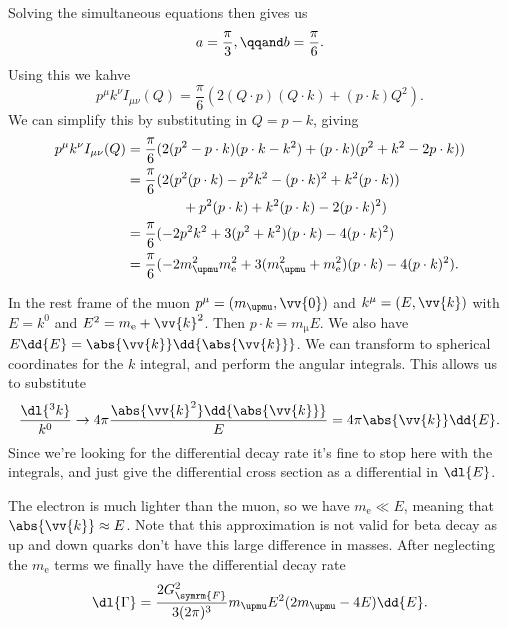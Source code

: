 \documentclass[fleqn]{NotesClass}
\newcommand{\Pparticle}[1]{\mathrm{#1}}
\newcommand{\Pex}{\ensuremath{\Pparticle{e}}}
\newcommand{\Pmux}{\ensuremath{\upmu}}
\newcommand{\fermiConst}{G_{\symrm{F}}}
\begin{document}
    Solving the simultaneous equations then gives us
    \begin{equation}
        a = \frac{\pi}{3}, \qqand b = \frac{\pi}{6}.
    \end{equation}
    Using this we kahve
    \begin{equation}
        p^\mu k^\nu I_{\mu\nu}(Q) = \frac{\pi}{6}(2(Q \cdot p)(Q \cdot k) + (p \cdot k)Q^2).
    \end{equation}
    We can simplify this by substituting in \(Q = p - k\), giving
    \begin{align}
        p^\mu k^\nu I_{\mu\nu}(Q) &= \frac{\pi}{6}(2(p^2 - p \cdot k)(p \cdot k - k^2) + (p \cdot k)(p^2 + k^2 - 2p\cdot k))\notag\\
        &= \frac{\pi}{6}(2(p^2(p \cdot k) - p^2k^2 - (p \cdot k)^2 + k^2(p \cdot k))\\
        &\qquad\qquad + p^2(p\cdot k) + k^2(p \cdot k) - 2(p \cdot k)^2)\\
        &= \frac{\pi}{6}(-2p^2 k^2 + 3(p^2 + k^2)(p \cdot k) - 4(p \cdot k)^2)\\
        &= \frac{\pi}{6}(-2m_{\Pmux}^2m_{\Pex}^2 + 3(m_{\Pmux}^2 + m_{\Pex}^2)(p \cdot k) - 4(p \cdot k)^2).
    \end{align}
    
    In the rest frame of the muon \(p^\mu = (m_{\Pmux}, \vv{0})\) and \(k^\mu = (E, \vv{k})\) with \(E = k^0\) and \(E^2 = m_{\Pex} + \vv{k}^2\).
    Then \(p \cdot k = m_{\Pmux}E\).
    We also have \(E\dd{E} = \abs{\vv{k}} \dd{\abs{\vv{k}}}\).
    We can transform to spherical coordinates for the \(k\) integral, and perform the angular integrals.
    This allows us to substitute
    \begin{equation}
        \frac{\dl{^3k}}{k^0} \to 4\pi \frac{\abs{\vv{k}^2} \dd{\abs{\vv{k}}}}{E} = 4\pi \abs{\vv{k}} \dd{E}.
    \end{equation}
    Since we're looking for the differential decay rate it's fine to stop here with the integrals, and just give the differential cross section as a differential in \(\dl{E}\).
    
    The electron is much lighter than the muon, so we have \(m_{\Pex} \ll E\), meaning that \(\abs{\vv{k}} \approx E\).
    Note that this approximation is not valid for beta decay as up and down quarks don't have this large difference in masses.
    After neglecting the \(m_{\Pex}\) terms we finally have the differential decay rate
    \begin{equation}
        \dl{\Gamma} = \frac{2\fermiConst^2}{3(2\pi)^3} m_{\Pmux} E^2(2m_{\Pmux} - 4E) \dd{E}.
    \end{equation}
    
\end{document}
